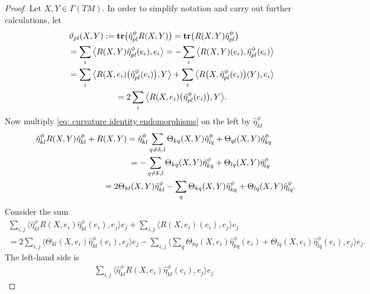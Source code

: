 \documentclass[pdftex]{sigma}
\newcommand{\tr}{\mbox{\bf tr}}
\numberwithin{equation}{section}
\begin{document}
\begin{proof}\allowdisplaybreaks Let $X,Y\in\Gamma(TM)$. In order to simplify notation and carry out further calculations, let
\begin{gather} \vartheta_{pl}(X,Y):= \tr\big(\hat{\eta}^\phi_{pl}{R(X,Y)}\big)=\tr\big({R(X,Y)}\hat{\eta}^\phi_{pl}\big)\nonumber\\
 \hphantom{\vartheta_{pl}(X,Y)}{} =
 \sum_i \big\langle {R(X,Y)}\hat{\eta}^\phi_{pl}(e_i),e_i\big\rangle =
 -\sum_i \big\langle {R(X,Y)}(e_i),\hat{\eta}^\phi_{pl}(e_i)\big\rangle \nonumber\\
\hphantom{\vartheta_{pl}(X,Y)}{} =
 \sum_i \big\langle {R(X,e_i)}\big(\hat{\eta}^\phi_{pl}(e_i)\big), Y\big\rangle +\sum_i \big\langle {R\big(X,\hat{\eta}^\phi_{pl}(e_i)\big) }(Y),e_i\big\rangle \nonumber\\
\hphantom{\vartheta_{pl}(X,Y)}{}
 =
 2\sum_i \big\langle {R(X,e_i)}\big(\hat{\eta}^\phi_{pl}(e_i)\big), Y\big\rangle .\label{eq: definition vartheta}
\end{gather}
Now multiply \eqref{eq: curvature identity endomorphisms}
on the left by $\hat\eta_{kl}^\phi$
\begin{gather}
\hat{\eta}^\phi_{kl}{R(X,Y)}\hat{\eta}^\phi_{kl}+{R(X,Y)} =
\hat{\eta}^\phi_{kl} \sum_{q\not= k,l} \Theta_{kq}(X,Y) \hat{\eta}^\phi_{lq}+ \Theta_{ql}(X,Y)\hat{\eta}^\phi_{kq}\nonumber\\
\hphantom{\hat{\eta}^\phi_{kl}{R(X,Y)}\hat{\eta}^\phi_{kl}+{R(X,Y)}}{} =
- \sum_{q\not= k,l} \Theta_{kq}(X,Y) \hat{\eta}^\phi_{kq}+ \Theta_{lq}(X,Y)\hat{\eta}^\phi_{lq}\nonumber\\
\hphantom{\hat{\eta}^\phi_{kl}{R(X,Y)}\hat{\eta}^\phi_{kl}+{R(X,Y)}}{} =
 2\Theta_{kl}(X,Y)\hat\eta_{kl}^\phi -\sum_{q} \Theta_{kq}(X,Y) \hat{\eta}^\phi_{kq}+ \Theta_{lq}(X,Y)\hat{\eta}^\phi_{lq}. \label{eq: curvature identity endomorphisms 2}
\end{gather}
Consider the sum
\begin{gather*}
\sum_{i,j}\big\langle \hat{\eta}^\phi_{kl}{R(X,e_i)}\hat{\eta}^\phi_{kl}(e_i),e_j\big\rangle e_j +\sum_{i,j}\langle {R(X,e_i)}(e_i),e_j\rangle e_j\\
{}= 2\sum_{i,j}\big\langle \Theta_{kl}(X,e_i)\hat\eta_{kl}^\phi(e_i),e_j\big\rangle e_j -\sum_{i,j}\bigg\langle \sum_{q} \Theta_{kq}(X,e_i) \hat{\eta}^\phi_{kq}(e_i)
 + \Theta_{lq}(X,e_i)\hat{\eta}^\phi_{lq}(e_i),e_j\bigg\rangle e_j.
\end{gather*}
The left-hand side is
\begin{gather*}
\sum_{i,j}\big\langle \hat{\eta}^\phi_{kl}{R(X,e_i)}\hat{\eta}^\phi_{kl}(e_i),e_j\big\rangle e_j

\end{gather*}
\end{proof}
\end{document}
